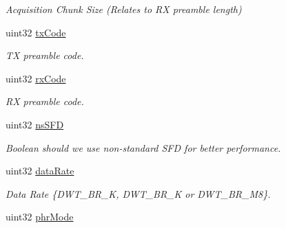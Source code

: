 \begin{DoxyCompactItemize}
\begin{DoxyCompactList}\small\item\em Acquisition Chunk Size (Relates to R\-X preamble length) \end{DoxyCompactList}\item 
\hypertarget{structdwt__config__t_a1313b903e3619451aff4a231525823d9}{uint32 \hyperlink{structdwt__config__t_a1313b903e3619451aff4a231525823d9}{tx\-Code}}\label{structdwt__config__t_a1313b903e3619451aff4a231525823d9}

\begin{DoxyCompactList}\small\item\em T\-X preamble code. \end{DoxyCompactList}\item 
\hypertarget{structdwt__config__t_a8a614654cca27717a1f56cd09dd419c7}{uint32 \hyperlink{structdwt__config__t_a8a614654cca27717a1f56cd09dd419c7}{rx\-Code}}\label{structdwt__config__t_a8a614654cca27717a1f56cd09dd419c7}

\begin{DoxyCompactList}\small\item\em R\-X preamble code. \end{DoxyCompactList}\item 
\hypertarget{structdwt__config__t_a19de71ece41734cf2c698e081199cf43}{uint32 \hyperlink{structdwt__config__t_a19de71ece41734cf2c698e081199cf43}{ns\-S\-F\-D}}\label{structdwt__config__t_a19de71ece41734cf2c698e081199cf43}

\begin{DoxyCompactList}\small\item\em Boolean should we use non-\/standard S\-F\-D for better performance. \end{DoxyCompactList}\item 
\hypertarget{structdwt__config__t_a5c32084040a66c1067d786c1fdebcb0c}{uint32 \hyperlink{structdwt__config__t_a5c32084040a66c1067d786c1fdebcb0c}{data\-Rate}}\label{structdwt__config__t_a5c32084040a66c1067d786c1fdebcb0c}

\begin{DoxyCompactList}\small\item\em Data Rate \{D\-W\-T\-\_\-\-B\-R\-\_\-K, D\-W\-T\-\_\-\-B\-R\-\_\-K or D\-W\-T\-\_\-\-B\-R\-\_\-M8\}. \end{DoxyCompactList}\item 
\hypertarget{structdwt__config__t_a8db5151571a357a0108893f7eb7b7afa}{uint32 \hyperlink{structdwt__config__t_a8db5151571a357a0108893f7eb7b7afa}{phr\-Mode}}\label{structdwt__config__t_a8db5151571a357a0108893f7eb7b7afa}


\end{DoxyCompactItemize}
